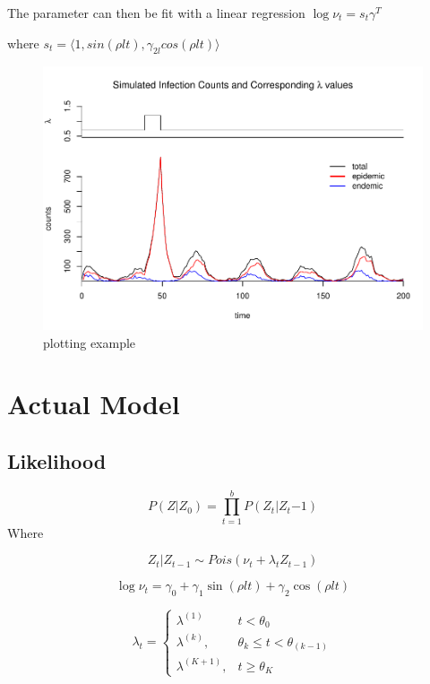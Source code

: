 \documentclass[]{article}
\numberwithin{equation}{section}
\begin{document}
The parameter can then be fit with a linear regression
\(\log{\nu_t} = s_t\gamma^T\)

where
\(s_t = \langle 1, sin(\rho l t), \gamma_{2l}cos(\rho l t) \rangle\)

\begin{figure}
\centering
\includegraphics{thesis_draft_files/figure-latex/simulation figure-1.pdf}
\caption{\label{fig:figs}plotting example}
\end{figure}

\hypertarget{actual-model}{%
\section{Actual Model}\label{actual-model}}

\hypertarget{likelihood}{%
\subsection{Likelihood}\label{likelihood}}

\[P(Z|Z_0) = \prod_{t=1}^b P(Z_t|Z_t{-1})\] Where

\[Z_t|Z_{t-1} \sim Pois(\nu_t + \lambda_tZ_{t-1})\]

\[\log{\nu_t} = \gamma_0 +  \gamma_{1}\sin(\rho l t)+\gamma_{2}\cos(\rho l t)\]

\[ \lambda_t =  \begin{cases} \lambda^{(1)} & t < \theta_0 \\
\lambda^{(k)}, & \theta_{k} \leq t < \theta_{(k-1)} \\
\lambda^{(K+1)}, & t \geq \theta_K \end{cases}\]
\end{document}
